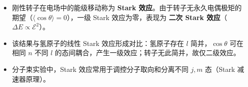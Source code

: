 \begin{insightbox}[物理图像]
\begin{itemize}
    \item 刚性转子在电场中的能级移动称为 \textbf{Stark 效应}。由于转子无永久电偶极矩的期望（$\langle\cos\theta\rangle=0$），一级 Stark 效应为零，表现为 \textbf{二次 Stark 效应}（$\Delta E\propto\mathcal{E}^2$）。
    \item 该结果与氢原子的线性 Stark 效应形成对比：氢原子存在 $l$ 简并，$\cos\theta$ 可在相同 $n$ 不同 $l$ 的态间耦合，产生一级效应；转子无此简并，故仅二级效应。
    \item 分子束实验中，Stark 效应常用于调控分子取向和分离不同 $j,m$ 态（Stark 减速器原理）。
\end{itemize}
\end{insightbox}
